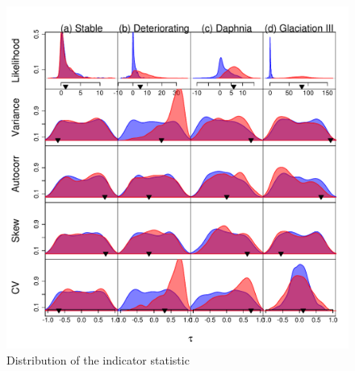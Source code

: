 \documentclass[authoryear,review,11pt]{elsarticle}
\begin{document}
%


\begin{figure}[ht]
  \begin{center}
    \includegraphics{FigS1.pdf}
  \end{center}
  \caption{Distribution of the indicator statistic}
  \label{fig:S1}
\end{figure}
\end{document}
